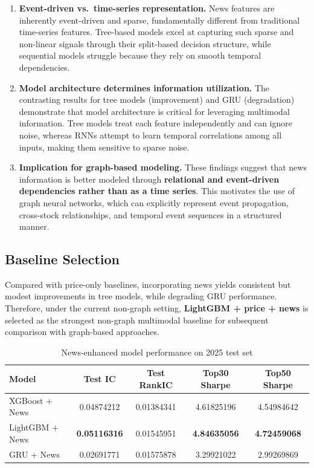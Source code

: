\begin{enumerate}
\item \textbf{Event-driven vs.\ time-series representation.} News features are inherently event-driven and sparse, fundamentally different from traditional time-series features. Tree-based models excel at capturing such sparse and non-linear signals through their split-based decision structure, while sequential models struggle because they rely on smooth temporal dependencies.

\item \textbf{Model architecture determines information utilization.} The contrasting results for tree models (improvement) and GRU (degradation) demonstrate that model architecture is critical for leveraging multimodal information. Tree models treat each feature independently and can ignore noise, whereas RNNs attempt to learn temporal correlations among all inputs, making them sensitive to sparse noise.

\item \textbf{Implication for graph-based modeling.} These findings suggest that news information is better modeled through \textbf{relational and event-driven dependencies rather than as a time series}. This motivates the use of graph neural networks, which can explicitly represent event propagation, cross-stock relationships, and temporal event sequences in a structured manner.

\end{enumerate}

\subsection{Baseline Selection}

Compared with price-only baselines, incorporating news yields consistent but modest improvements in tree models, while degrading GRU performance. Therefore, under the current non-graph setting, \textbf{LightGBM + price + news} is selected as the strongest non-graph multimodal baseline for subsequent comparison with graph-based approaches.

\begin{table}[htbp]
\centering
\caption{News-enhanced model performance on 2025 test set}
\label{tab:news-test-results}
\begin{tabular}{lcccc}
\hline
Model & Test IC & Test RankIC & Top30 Sharpe & Top50 Sharpe \\
\hline
XGBoost + News & 0.04874212 & 0.01384341 & 4.61825196 & 4.54984642 \\
LightGBM + News & \textbf{0.05116316} & 0.01545951 & \textbf{4.84635056} & \textbf{4.72459068} \\
GRU + News & 0.02691771 & 0.01575878 & 3.29921022 & 2.99269869 \\
\hline
\end{tabular}
\end{table}

